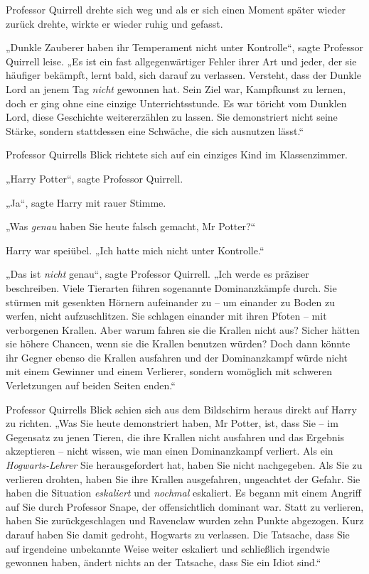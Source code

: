 {Professor Quirrell drehte sich weg und als er sich einen Moment später wieder zurück drehte, wirkte er wieder ruhig und gefasst.

„Dunkle Zauberer haben ihr Temperament nicht unter Kontrolle“, sagte Professor Quirrell leise. „Es ist ein fast allgegenwärtiger Fehler ihrer Art und jeder, der sie häufiger bekämpft, lernt bald, sich darauf zu verlassen. Versteht, dass der Dunkle Lord an jenem Tag \emph{nicht} gewonnen hat. Sein Ziel war, Kampfkunst zu lernen, doch er ging ohne eine einzige Unterrichtsstunde. Es war töricht vom Dunklen Lord, diese Geschichte weitererzählen zu lassen. Sie demonstriert nicht seine Stärke, sondern stattdessen eine Schwäche, die sich ausnutzen lässt.“

Professor Quirrells Blick richtete sich auf ein einziges Kind im Klassenzimmer.

„Harry Potter“, sagte Professor Quirrell.

„Ja“, sagte Harry mit rauer Stimme.

„Was \emph{genau} haben Sie heute falsch gemacht, Mr Potter?“

Harry war speiübel. „Ich hatte mich nicht unter Kontrolle.“

„Das ist \emph{nicht} genau“, sagte Professor Quirrell. „Ich werde es präziser beschreiben. Viele Tierarten führen sogenannte Dominanzkämpfe durch. Sie stürmen mit gesenkten Hörnern aufeinander zu -- um einander zu Boden zu werfen, nicht aufzuschlitzen. Sie schlagen einander mit ihren Pfoten -- mit verborgenen Krallen. Aber warum fahren sie die Krallen nicht aus? Sicher hätten sie höhere Chancen, wenn sie die Krallen benutzen würden? Doch dann könnte ihr Gegner ebenso die Krallen ausfahren und der Dominanzkampf würde nicht mit einem Gewinner und einem Verlierer, sondern womöglich mit schweren Verletzungen auf beiden Seiten enden.“

Professor Quirrells Blick schien sich aus dem Bildschirm heraus direkt auf Harry zu richten. „Was Sie heute demonstriert haben, Mr Potter, ist, dass Sie -- im Gegensatz zu jenen Tieren, die ihre Krallen nicht ausfahren und das Ergebnis akzeptieren -- nicht wissen, wie man einen Dominanzkampf verliert. Als ein \emph{Hogwarts-Lehrer} Sie herausgefordert hat, haben Sie nicht nachgegeben. Als Sie zu verlieren drohten, haben Sie ihre Krallen ausgefahren, ungeachtet der Gefahr. Sie haben die Situation \emph{eskaliert} und \emph{nochmal} eskaliert. Es begann mit einem Angriff auf Sie durch Professor Snape, der offensichtlich dominant war. Statt zu verlieren, haben Sie zurückgeschlagen und Ravenclaw wurden zehn Punkte abgezogen. Kurz darauf haben Sie damit gedroht, Hogwarts zu verlassen. Die Tatsache, dass Sie auf irgendeine unbekannte Weise weiter eskaliert und schließlich irgendwie gewonnen haben, ändert nichts an der Tatsache, dass Sie ein Idiot sind.“

}
